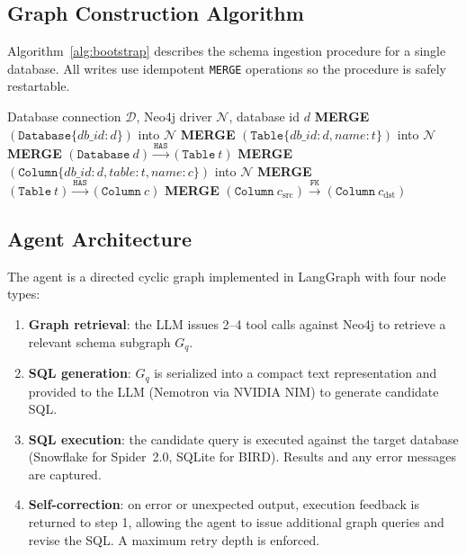 \documentclass[11pt]{article}
\begin{document}
\subsection{Graph Construction Algorithm}

Algorithm~\ref{alg:bootstrap} describes the schema ingestion procedure for a single database.
All writes use idempotent \texttt{MERGE} operations so the procedure is safely restartable.

\begin{algorithm}
\caption{Schema bootstrap for database $d$}
\label{alg:bootstrap}
\begin{algorithmic}[1]
\Require Database connection $\mathcal{D}$, Neo4j driver $\mathcal{N}$, database id $d$
\State \textbf{MERGE} $(\texttt{Database}\{db\_id: d\})$ into $\mathcal{N}$
  \State \textbf{MERGE} $(\texttt{Table}\{db\_id: d, name: t\})$ into $\mathcal{N}$
  \State \textbf{MERGE} $(\texttt{Database}\ d) \xrightarrow{\texttt{HAS}} (\texttt{Table}\ t)$
    \State \textbf{MERGE} $(\texttt{Column}\{db\_id: d, table: t, name: c\})$ into $\mathcal{N}$
    \State \textbf{MERGE} $(\texttt{Table}\ t) \xrightarrow{\texttt{HAS}} (\texttt{Column}\ c)$
  \EndFor
\EndFor
{}
  \State \textbf{MERGE} $(\texttt{Column}\ c_{\text{src}}) \xrightarrow{\texttt{FK}} (\texttt{Column}\ c_{\text{dst}})$
\EndFor
\end{algorithmic}
\end{algorithm}

\subsection{Agent Architecture}

The agent is a directed cyclic graph implemented in LangGraph with four node types:

\begin{enumerate}[leftmargin=*]
  \item \textbf{Graph retrieval}: the LLM issues 2--4 tool calls against Neo4j to retrieve a relevant schema subgraph $G_q$.
  \item \textbf{SQL generation}: $G_q$ is serialized into a compact text representation and provided to the LLM (Nemotron via NVIDIA NIM) to generate candidate SQL.
  \item \textbf{SQL execution}: the candidate query is executed against the target database (Snowflake for Spider~2.0, SQLite for BIRD). Results and any error messages are captured.
  \item \textbf{Self-correction}: on error or unexpected output, execution feedback is returned to step 1, allowing the agent to issue additional graph queries and revise the SQL. A maximum retry depth is enforced.
\end{enumerate}
\end{document}
